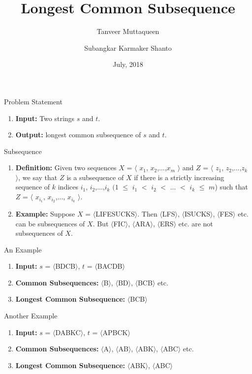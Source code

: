 \documentclass{beamer}
\title{Longest Common Subsequence}
\author{Tanveer Muttaqueen \and Subangkar Karmaker Shanto}
\institute[Universities of Somewhere and Elsewhere] %
{
Department of Computer Science \& Engineering\\
Bangladesh University of Engineering and Technology
}
\date{July, 2018}
\begin{document}
\begin{frame}
  \titlepage
\end{frame}


\begin{frame}{Problem Statement}
\begin{enumerate}
    \onslide\item<1-> \textbf{Input:} Two strings $s$ and $t$. 
    \onslide\item<2-> \textbf{Output:} longest common subsequence of $s$ and $t$.
\end{enumerate}
\end{frame}

\begin{frame}{Subsequence}
\begin{enumerate}
    \onslide\item<1-> \textbf{Definition:} Given two
sequences $X$ = $\langle$ $x_1$, $x_2$,...,$x_m$ $\rangle$ and $Z$  = $\langle$ $z_1$, $z_2$,...,$z_k$ $\rangle$, we say that $Z$ is a subsequence of $X$ if there is a strictly increasing sequence of $k$ indices $i_1$, $i_2$,...,$i_k$  $(1$ $\leq$ $i_1$ $<$ $i_2$ $<$ ... $<$ $i_k$ $\leq$ $m$) such that $Z$ = $\langle$ $x_{i_1}$, $x_{i_2}$,..., $x_{i_k}$ $\rangle$. 
    \onslide\item<2-> \textbf{Example:} Suppose $X$ = $\langle$LIFESUCKS$\rangle$. Then $\langle$LFS$\rangle$, $\langle$ISUCKS$\rangle$, $\langle$FES$\rangle$ etc. can be  subsequences of $X$. But $\langle$FIC$\rangle$, $\langle$ARA$\rangle$, $\langle$ERS$\rangle$ etc. are not subsequences of $X$. 
\end{enumerate}
\end{frame}


\begin{frame}{An Example}
\begin{enumerate}
    \onslide\item<1-> \textbf{Input:} $s$ = $\langle$BDCB$\rangle$,  $t$ = $\langle$BACDB$\rangle$
    \onslide\item<2-> \textbf{Common Subsequences:} $\langle$B$\rangle$, $\langle$BD$\rangle$, $\langle$BCB$\rangle$ etc.
    \onslide\item<3-> \textbf{Longest Common Subsequence:} $\langle$BCB$\rangle$
\end{enumerate}
\end{frame}



\begin{frame}{Another Example}
\begin{enumerate}
    \onslide\item<1-> \textbf{Input:} $s$ = $\langle$DABKC$\rangle$,  $t$ = $\langle$APBCK$\rangle$
    \onslide\item<2-> \textbf{Common Subsequences:} $\langle$A$\rangle$, $\langle$AB$\rangle$, $\langle$ABK$\rangle$, $\langle$ABC$\rangle$ etc.
    \onslide\item<3-> \textbf{Longest Common Subsequence:} $\langle$ABK$\rangle$, $\langle$ABC$\rangle$
\end{enumerate}
\end{frame}
\end{document}
